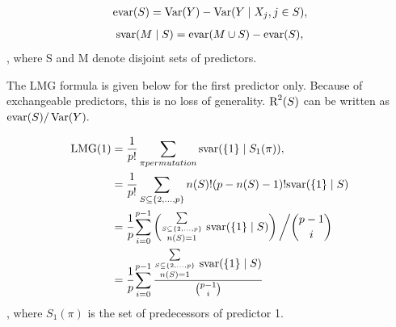 \documentclass[11pt,a4paper,twoside]{book}\usepackage[]{graphicx}\usepackage[]{color}
\begin{document}
   \begin{align} 
     \text{evar}(S) = \operatorname{Var}(Y) - \operatorname{Var}( Y \mid X_{j}, j \in S),   \label{eq:1} 
   \end{align} 
   \begin{align} 
     \text{svar}(M \mid S) = \text{evar}(M \cup S) - \text{evar}(S), \label{eq:2} 
    \end{align} , where S and M denote disjoint sets of predictors.
    
   The LMG formula is given below for the first predictor only. Because of exchangeable predictors, this is no loss of generality.  $\text{R}^2(S)$ can be written as $\text{evar}(S)/\operatorname{Var}(Y).$ 

   \begin{align} 
     \LMG(1) &= \frac{1}{p!} \sum_{\pi permutation}^{} \SVAR(\{1\} \mid S_{1}(\pi)),   \nonumber  \\
     &= \frac{1}{p!} \sum_{S \subseteq \{ 2, \dots, p \} }^{} n(S)!(p-n(S)-1)! \SVAR(\{1\} \mid S) \nonumber  \\
     &=  \cfrac{1}{p} \sum_{i=0}^{p-1} \left( \substack {\sum\limits_{ S \subseteq \{ 2, \dots, p \}}\\n(S)=1}^{} \ \SVAR(\{1\} \mid S)\right)\bigg/ \binom{p-1}{i}\\   
         &=  \cfrac{1}{p} \sum_{i=0}^{p-1} \frac{ \substack{\sum\limits_{ S \subseteq \{ 2, \dots, p \}}\\n(S)=1}^{} \ \SVAR(\{1\} \mid S)}{\binom{p-1}{i}} \\      
   \end{align},
   where $S_{1}(\pi)$ is the set of predecessors of predictor 1.
   
\end{document}
